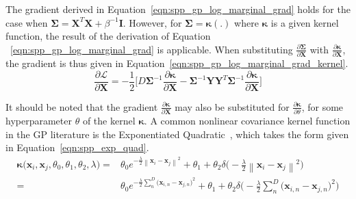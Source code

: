 The gradient derived in Equation~\ref{eqn:spp_gp_log_marginal_grad} holds 
for the case when \( \bm{\Sigma} = \bm{X}^{T}\bm{X} + \beta^{-1} \bm{I} \). 
However, for \( \bm{\Sigma} = \bm{\kappa}(.) \) where \( \bm{\kappa} \) is 
a given kernel function, the result of the derivation of Equation
~\ref{eqn:spp_gp_log_marginal_grad} is applicable. When substituting 
\( \frac{\partial \bm{\Sigma}}{\partial \bm{X}} \) with 
\( \frac{\partial \bm{\kappa}}{\partial \bm{X}} \), the gradient is thus 
given in Equation~\ref{eqn:spp_gp_log_marginal_grad_kernel}.
\begin{equation}
  \label{eqn:spp_gp_log_marginal_grad_kernel}
  \frac{\partial \mathcal{L}}{\partial \bm{X}} = 
  -\frac{1}{2} \Bigg[
    D \bm{\Sigma}^{-1} \frac{\partial \bm{\kappa}}{\partial \bm{X}}
    - \bm{\Sigma}^{-1} \bm{YY}^{T} \bm{\Sigma}^{-1} 
    \frac{\partial \bm{\kappa}}{\partial \bm{X}}
  \Bigg]
\end{equation}

It should be noted that the gradient \( \frac{\partial \bm{\kappa}}{\partial \bm{X}} \)
may also be substituted for \( \frac{\partial \bm{\kappa}}{\partial \theta} \), for 
some hyperparameter \( \theta \) of the kernel \( \bm{\kappa} \). A common nonlinear covariance 
kernel function in the GP literature is the Exponentiated Quadratic~\cite{Lawrence2005}, which takes 
the form given in Equation~\ref{eqn:spp_exp_quad}.
\begin{align}
  \label{eqn:spp_exp_quad}
  \bm{\kappa} \big( \bm{x}_{i}, \bm{x}_{j}, \theta_{0}, 
  \theta_{1}, \theta_{2}, \lambda \big) ={}&
  \theta_{0} e^{-\frac{\lambda}{2} 
  \left\lVert \bm{x}_{i} - \bm{x}_{j} \right\rVert^{2}}
  + \theta_{1} + \theta_{2} \delta \big( -\frac{\lambda}{2} 
  \left\lVert \bm{x}_{i} - \bm{x}_{j} \right\rVert^{2} \big)\\
  ={}& \theta_{0} e^{-\frac{\lambda}{2} 
  \sum_{n}^{D} {\big( \bm{x}_{i, n} - \bm{x}_{j, n} \big)}^{2}}
  + \theta_{1} + \theta_{2} \delta \big( -\frac{\lambda}{2} 
  \sum_{n}^{D} {\big( \bm{x}_{i, n} - \bm{x}_{j, n} \big)}^{2} \big)
\end{align}

